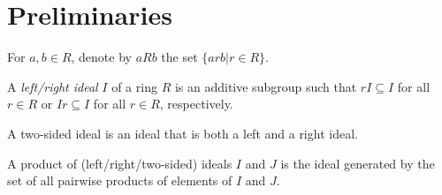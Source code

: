 %

\section{Preliminaries}
  \begin{definition}
      For $a, b \in R$, denote by $aRb$ the set $\{arb| r \in R\}$.
  \end{definition}

  \begin{definition}
    A \textit{left/right ideal} $I$ of a ring $R$ is an additive subgroup such that $rI \subseteq I$ for all $r \in R$ or $Ir \subseteq I$ for all $r \in R$, respectively.
  \end{definition}

  \begin{definition}
    A two-sided ideal is an ideal that is both a left and a right ideal.
  \end{definition}

  \begin{definition}
    A product of (left/right/two-sided) ideals $I$ and $J$ is the ideal generated by the set of all pairwise products of elements of $I$ and $J$.
  \end{definition}

